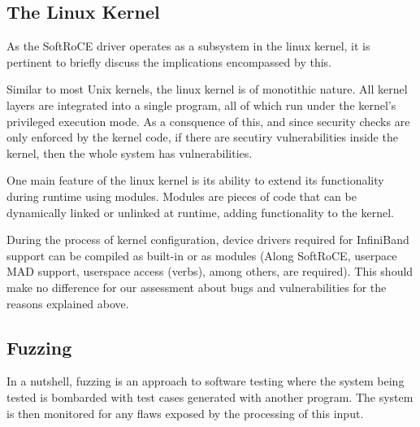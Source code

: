 
\subsection{The Linux Kernel}


As the SoftRoCE driver operates as a subsystem in the linux kernel, it is pertinent to briefly
discuss the implications encompassed by this.

Similar to most Unix kernels, the linux kernel is of monotithic nature. All kernel layers
are integrated into a single program, all of which run under the kernel's privileged execution
mode. As a consquence of this, and since security checks are only enforced by the kernel code,
if there are secutiry vulnerabilities inside the kernel, then the whole system has vulnerabilities.

One main feature of the linux kernel is its ability to extend its functionality during runtime using
modules. Modules are pieces of code that can be dynamically linked or unlinked at runtime,
adding functionality to the kernel\cite{ldd3}.

During the process of kernel configuration, device drivers required for InfiniBand support can
be compiled as built-in or as modules (Along SoftRoCE, userpace MAD support,
userspace access (verbs), among others, are required). This should make no difference for our assessment
about bugs and vulnerabilities for the reasons explained above.


\subsection{Fuzzing}

In a nutshell, fuzzing is an approach to software testing where the system being tested is bombarded with test cases generated with another program. The system is then monitored for any flaws exposed by the processing of
this input\cite{mcnally12}.

